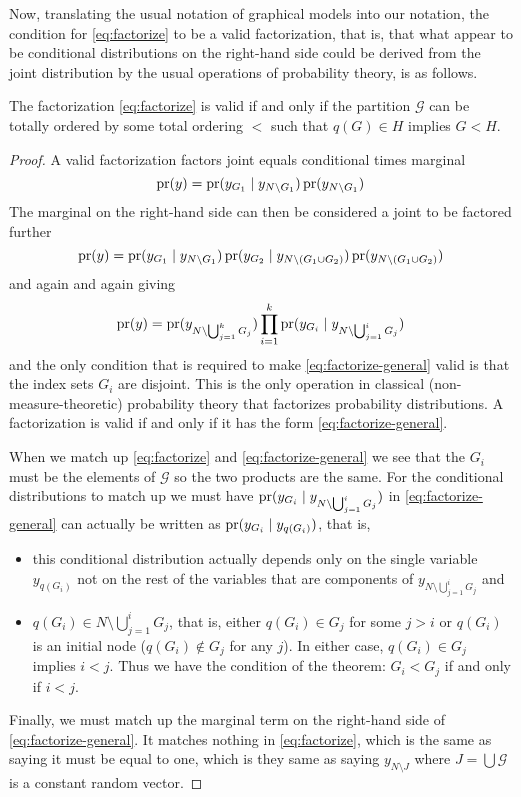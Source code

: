 Now, translating the usual notation of graphical models into our notation,
the condition for \eqref{eq:factorize} to be a valid factorization, that is,
that what appear to be conditional distributions on the right-hand side could
be derived from the joint distribution by the usual operations of probability
theory, is as follows.
\begin{theorem} \label{th:factorize}
The factorization \eqref{eq:factorize} is valid if and only if
the partition $\mathcal{G}$ can be totally ordered
by some total ordering $<$ such that $q(G) \in H$ implies $G < H$.
\end{theorem}
\begin{proof}
A valid factorization factors joint equals conditional times marginal
$$
   \operatorname{pr}(y) = \operatorname{pr}(y_{G_1} \mid y_{N \setminus G_1}) \operatorname{pr}(y_{N \setminus G_1})
$$
The marginal on the right-hand side can then be considered a joint to be
factored further
$$
   \operatorname{pr}(y)
   =
   \operatorname{pr}(y_{G_1} \mid y_{N \setminus G_1})
   \operatorname{pr}(y_{G_2} \mid y_{N \setminus (G_1 \cup G_2)})
   \operatorname{pr}(y_{N \setminus (G_1 \cup G_2)})
$$
and again and again giving
\begin{equation} \label{eq:factorize-general}
   \operatorname{pr}(y)
   =
   \operatorname{pr}(y_{N \setminus \bigcup_{j = 1}^k G_j})
   \prod_{i = 1}^k
   \operatorname{pr}(y_{G_i} \mid y_{N \setminus \bigcup_{j = 1}^i G_j})
\end{equation}
and the only condition that is required to make \eqref{eq:factorize-general}
valid is that the index sets $G_i$ are disjoint.  This is the only operation
in classical (non-measure-theoretic) probability theory that factorizes
probability distributions.  A factorization is valid if and only if it
has the form \eqref{eq:factorize-general}.

When we match up \eqref{eq:factorize} and \eqref{eq:factorize-general}
we see that the $G_i$ must be the elements of $\mathcal{G}$ so the two
products are the same.  For the conditional distributions to
match up we must have $\operatorname{pr}(y_{G_i} \mid y_{N \setminus \bigcup_{j = 1}^i G_j})$
in \eqref{eq:factorize-general} can actually be written as
$\operatorname{pr}(y_{G_i} \mid y_{q(G_i)})$, that is,
\begin{itemize}
\item this conditional distribution actually depends only on the single
    variable $y_{q(G_i)}$ not on the rest of the variables that are components
    of $y_{N \setminus \bigcup_{j = 1}^i G_j}$ and
\item $q(G_i) \in N \setminus \bigcup_{j = 1}^i G_j$, that is, either
    $q(G_i) \in G_j$ for some $j > i$ or $q(G_i)$ is an initial node
    ($q(G_i) \notin G_j$ for any $j$).  In either case,
    $q(G_i) \in G_j$ implies $i < j$.  Thus we have the condition of
    the theorem: $G_i < G_j$ if and only if $i < j$.
\end{itemize}
Finally, we must match up the marginal term on the right-hand side of
\eqref{eq:factorize-general}.  It matches nothing in \eqref{eq:factorize},
which is the same as saying it must be equal to one, which is they same as
saying $y_{N \setminus J}$ where $J = \bigcup \mathcal{G}$ is a constant
random vector.
\end{proof}

